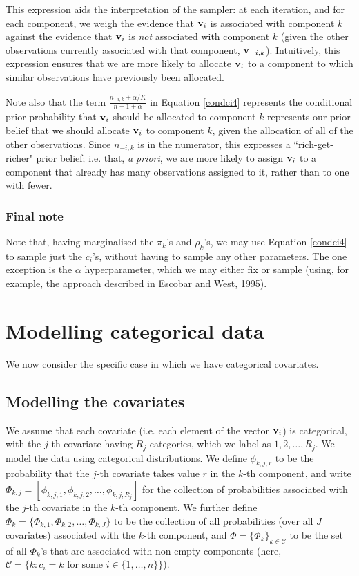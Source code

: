 \documentclass[fleqn,11pt]{wlscirep}
\begin{document}
This expression aids the interpretation of the sampler: at each iteration, and for each component, we weigh the evidence that ${\bf v}_i$ is associated with component $k$ against the evidence that ${\bf v}_i$ is {\em not} associated with component $k$ (given the other observations currently associated with that component, ${\bf v}_{-i,k}$).  Intuitively, this expression ensures that we are more likely to allocate ${\bf v}_i$ to a component to which similar observations have previously been allocated.

Note also that the term $\frac{n_{-i,k} + \alpha/K}{n - 1 + \alpha} $ in Equation \eqref{condci4} represents the conditional prior probability that ${\bf v}_i$ should be allocated to component $k$ represents our prior belief that we should allocate ${\bf v}_i$ to component $k$, given the allocation of all of the other observations.  Since $n_{-i,k}$ is in the numerator, this expresses a ``rich-get-richer" prior belief; i.e. that, {\em a priori}, we are more likely to assign ${\bf v}_i$ to a component that already has many observations assigned to it, rather than to one with fewer.    

\subsubsection{Final note}
Note that, having marginalised the $\pi_k$'s and $\rho_k$'s, we may use Equation \eqref{condci4} to sample just the $c_i$'s, without having to sample any other parameters.  The one exception is the $\alpha$ hyperparameter, which we may either fix or sample (using, for example, the approach described in Escobar and West, 1995).  


\section{Modelling categorical data}
We now consider the specific case in which we have categorical covariates.  

\subsection{Modelling the covariates}
We assume that each covariate (i.e. each element of the vector ${\bf v}_i$) is categorical, with the $j$-th covariate having $R_j$ categories, which we label as $1, 2, \ldots, R_j$.  We model the data using categorical distributions.  We define $\phi_{k,j,r}$ to be the probability that the $j$-th covariate takes value $r$ in the $k$-th component, and write $\Phi_{k,j} = [\phi_{k,j,1}, \phi_{k,j,2}, \ldots, \phi_{k,j,R_j} ]$ for the collection of probabilities associated with the $j$-th covariate in the $k$-th component.  We further define $\Phi_{k} = \{\Phi_{k,1}, \Phi_{k,2}, \ldots, \Phi_{k,J}\}$ to be the collection of all probabilities (over all $J$ covariates) associated with the $k$-th component, and $\Phi = \{ \Phi_{k} \}_{k\in \mathcal{C}}$ to be the set of all $\Phi_{k}$'s that are associated with non-empty components (here, $\mathcal{C} = \{k: c_i = k \mbox{ for some } i \in \{1,\ldots,n\}\}$).  
\end{document}
